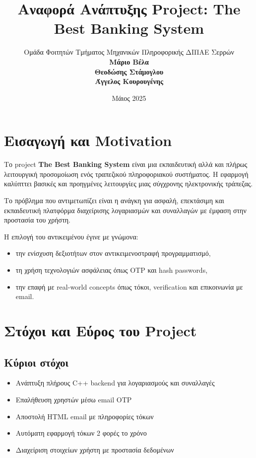 \documentclass[a4paper,12pt]{article}
\title{\textbf{Αναφορά Ανάπτυξης Project: The Best Banking System}}
\author{Ομάδα Φοιτητών Τμήματος Μηχανικών Πληροφορικής ΔΙΠΑΕ Σερρών \\[0.5em]
\textbf{Μάριο Βέλα} \\ 
\textbf{Θεοδώσης Στάμογλου} \\ 
\textbf{Άγγελος Κουρουγένης}}
\date{Μάιος 2025}
\begin{document}
\maketitle

\tableofcontents
\newpage

\section{Εισαγωγή και Motivation}
Το project \textbf{The Best Banking System} είναι μια εκπαιδευτική αλλά και πλήρως λειτουργική προσομοίωση ενός τραπεζικού πληροφοριακού συστήματος. Η εφαρμογή καλύπττει βασικές και προηγμένες λειτουργίες μιας σύγχρονης ηλεκτρονικής τράπεζας.

Το πρόβλημα που αντιμετωπίζει είναι η ανάγκη για ασφαλή, επεκτάσιμη και εκπαιδευτική πλατφόρμα διαχείρισης λογαριασμών και συναλλαγών με έμφαση στην προστασία του χρήστη.

Η επιλογή του αντικειμένου έγινε με γνώμονα:
\begin{itemize}[label=\textbullet]
    \item την ενίσχυση δεξιοτήτων στον αντικειμενοστραφή προγραμματισμό,
    \item τη χρήση τεχνολογιών ασφάλειας όπως OTP και hash passwords,
    \item την επαφή με real-world concepts όπως τόκοι, verification και επικοινωνία με email.
\end{itemize}

\section{Στόχοι και Εύρος του Project}
\subsection*{Κύριοι στόχοι}
\begin{itemize}[label=\textbullet]
    \item Ανάπτυξη πλήρους C++ backend για λογαριασμούς και συναλλαγές
    \item Επαλήθευση χρηστών μέσω email OTP
    \item Αποστολή HTML email με πληροφορίες τόκων
    \item Αυτόματη εφαρμογή τόκων 2 φορές το χρόνο
    \item Διαχείριση στοιχείων χρήστη με προστασία δεδομένων
\end{itemize}
\end{document}
